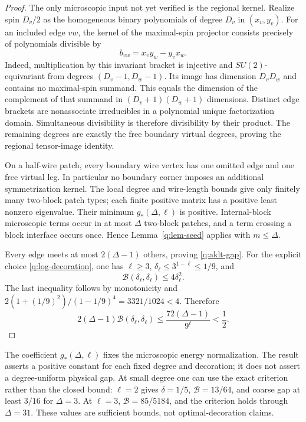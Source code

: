 \begin{proof}
The only microscopic input not yet verified is the regional kernel.
Realize spin $D_v/2$ as the homogeneous binary polynomials of degree
$D_v$ in $(x_v,y_v)$.  For an included edge $vw$, the kernel of the
maximal-spin projector consists precisely of polynomials divisible by
\[
 b_{vw}=x_vy_w-y_vx_w.
\]
Indeed, multiplication by this invariant bracket is injective and
$SU(2)$-equivariant from degrees $(D_v-1,D_w-1)$.  Its image has dimension
$D_vD_w$ and contains no maximal-spin summand.  This equals the
dimension of the complement of that summand in
$(D_v+1)(D_w+1)$ dimensions.  Distinct edge brackets are nonassociate
irreducibles in a polynomial unique factorization domain.  Simultaneous
divisibility is therefore divisibility by their product.  The remaining
degrees are exactly the free boundary virtual degrees, proving the
regional tensor-image identity.

On a half-wire patch, every boundary wire vertex has one omitted edge
and one free virtual leg.  In particular no boundary corner imposes an
additional symmetrization kernel.  The local degree and wire-length
bounds give only finitely many two-block patch types; each finite
positive matrix has a positive least nonzero eigenvalue.  Their minimum
$g_*(\Delta,\ell)$ is positive.  Internal-block microscopic terms occur
in at most $\Delta$ two-block patches, and a term crossing a block
interface occurs once.  Hence Lemma~\ref{q:lem-seed} applies with
$m\leq\Delta$.

Every edge meets at most $2(\Delta-1)$ others, proving
\eqref{q:aklt-gap}.  For the explicit choice
\eqref{q:log-decoration}, one has $\ell\geq3$,
$\delta_\ell\leq3^{1-\ell}\leq1/9$, and
\[
 \mathcal B(\delta_\ell,\delta_\ell)
 \leq4\delta_\ell^2.
\]
The last inequality follows by monotonicity and
$2(1+(1/9)^2)/(1-1/9)^4=3321/1024<4$.  Therefore
\[
 2(\Delta-1)\mathcal B(\delta_\ell,\delta_\ell)
 \leq\frac{72(\Delta-1)}{9^\ell}<\frac12.
\]
\end{proof}

The coefficient $g_*(\Delta,\ell)$ fixes the microscopic energy
normalization.  The result asserts a positive constant for each fixed
degree and decoration; it does not assert a degree-uniform physical
gap.  At small degree one can use the exact criterion rather than the
closed bound: $\ell=2$ gives $\delta=1/5$, $\mathcal B=13/64$, and
coarse gap at least $3/16$ for $\Delta=3$.  At $\ell=3$,
$\mathcal B=85/5184$, and the criterion holds through $\Delta=31$.
These values are sufficient bounds, not optimal-decoration claims.

